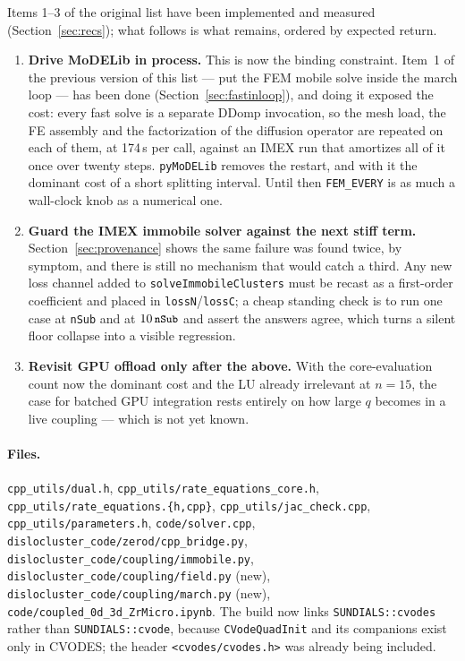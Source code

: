 \documentclass[11pt,a4paper]{article}
\newcommand{\code}[1]{\texttt{\small #1}}
\begin{document}
Items 1--3 of the original list have been implemented and measured
(Section~\ref{sec:recs}); what follows is what remains, ordered by expected
return.

\begin{enumerate}
\item \textbf{Drive MoDELib in process.} This is now the binding constraint.
      Item~1 of the previous version of this list --- put the FEM mobile solve
      inside the march loop --- has been done (Section~\ref{sec:fastinloop}),
      and doing it exposed the cost: every fast solve is a separate DDomp
      invocation, so the mesh load, the FE assembly and the factorization of the
      diffusion operator are repeated on each of them, at 174\,s per call,
      against an IMEX run that amortizes all of it once over twenty steps.
      \code{pyMoDELib} removes the restart, and with it the dominant cost of a
      short splitting interval. Until then \code{FEM\_EVERY} is as much a
      wall-clock knob as a numerical one.
\item \textbf{Guard the IMEX immobile solver against the next stiff term.}
      Section~\ref{sec:provenance} shows the same failure was found twice, by
      symptom, and there is still no mechanism that would catch a third. Any new
      loss channel added to \code{solveImmobileClusters} must be recast as a
      first-order coefficient and placed in \code{lossN}/\code{lossC}; a cheap
      standing check is to run one case at \code{nSub} and at $10\,\code{nSub}$
      and assert the answers agree, which turns a silent floor collapse into a
      visible regression.
\item \textbf{Revisit GPU offload only after the above.} With the core-evaluation
      count now the dominant cost and the LU already irrelevant at $n=15$, the
      case for batched GPU integration rests entirely on how large $q$ becomes
      in a live coupling --- which is not yet known.
\end{enumerate}

\paragraph{Files.}
\code{cpp\_utils/dual.h},
\code{cpp\_utils/rate\_equations\_core.h},
\code{cpp\_utils/rate\_equations.\{h,cpp\}},
\code{cpp\_utils/jac\_check.cpp},
\code{cpp\_utils/parameters.h},
\code{code/solver.cpp},
\code{dislocluster\_code/zerod/cpp\_bridge.py},
\code{dislocluster\_code/coupling/immobile.py},
\code{dislocluster\_code/coupling/field.py} (new),
\code{dislocluster\_code/coupling/march.py} (new),
\code{code/coupled\_0d\_3d\_ZrMicro.ipynb}.
The build now links \code{SUNDIALS::cvodes} rather than \code{SUNDIALS::cvode},
because \code{CVodeQuadInit} and its companions exist only in CVODES; the
header \code{<cvodes/cvodes.h>} was already being included.
\end{document}
